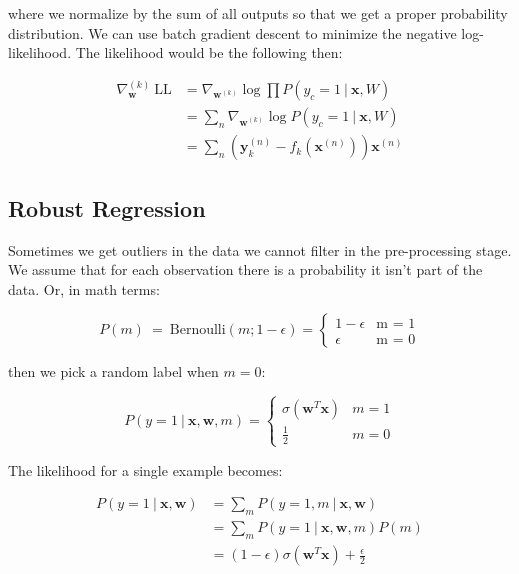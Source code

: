 \documentclass{article}
\newcommand{\vf}[1]{\mathbf{#1}}
\begin{document}
where we normalize by the sum of all outputs so that we get a proper probability distribution. We can use batch gradient descent to minimize the negative log-likelihood. The likelihood would be the following then:

\begin{align*}
    \nabla_{\vf{w}}^{(k)}\ \text{LL} &= \nabla_{\vf{w}^{(k)}} \log \prod P(y_c = 1\ |\ \vf{x}, W) \\
            &= \sum_n \nabla_{\vf{w}^{(k)}} \log P(y_c = 1\ |\ \vf{x}, W) \\ 
            &= \sum_n (\vf{y}_k^{(n)} - f_k(\vf{x}^{(n)})) \vf{x}^{(n)}
\end{align*}

\subsection{Robust Regression}
Sometimes we get outliers in the data we cannot filter in the pre-processing stage. We assume that for each observation there is a probability it isn't part of the data. Or, in math terms:

\begin{equation*}
    P(m)\ =\ \text{Bernoulli}(m; 1 - \epsilon) =
        \begin{cases}
            1 - \epsilon & \text{m = 1} \\
            \epsilon     & \text{m = 0}
        \end{cases}
\end{equation*}

then we pick a random label when $m = 0$:

\begin{equation}
    P(y = 1\ |\ \vf{x}, \vf{w}, m) =
        \begin{cases}
            \sigma(\vf{w}^T\vf{x}) & m = 1 \\
            \frac{1}{2}              & m = 0
        \end{cases}
\end{equation}

The likelihood for a single example becomes:

\begin{align*}
    P(y = 1\ |\ \vf{x}, \vf{w}) &= \sum_m 
        P(y = 1, m\ |\ \vf{x}, \vf{w}) \\
    &= \sum_m P(y = 1\ |\ \vf{x}, \vf{w}, m) P(m) \\
    &= (1 - \epsilon) \sigma(\vf{w}^T\vf{x}) + \frac{\epsilon}{2}
\end{align*}
\end{document}
